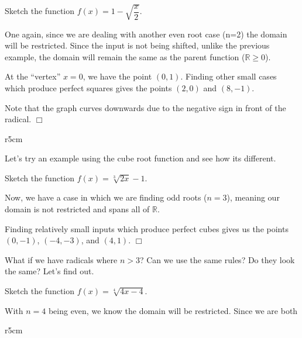\documentclass[../book.tex]{subfiles}
\begin{document}
\begin{example}
Sketch the function $f(x)=1-\sqrt{\dfrac{x}{2}}$.
\end{example}
\begin{solution}
One again, since we are dealing with another even root case (n=2) the domain will be restricted. Since the input is not being shifted, unlike the previous example, the domain will remain the same as the parent function ($\mathbb{R}\geq 0$).

At the “vertex” $x=0$, we have the point $(0,1)$. Finding other small cases which produce perfect squares gives the points $(2,0)$ and $(8,-1)$.

Note that the graph curves downwards due to the negative sign in front of the radical. $\Box$
\end{solution}

\begin{wrapfigure}{r}{5cm}
\end{wrapfigure}

Let's try an example using the cube root function and see how its different.
\begin{example}
Sketch the function $f(x)=\sqrt[3]{2x}-1$.
\end{example}
\begin{solution}
Now, we have a case in which we are finding odd roots ($n=3$), meaning our domain is not restricted and spans all of $\mathbb{R}$. 
\end{solution}
Finding relatively small inputs which produce perfect cubes gives us the points $(0,-1)$, $(-4,-3)$, and $(4,1)$. $\Box$

What if we have radicals where $n>3$? Can we use the same rules? Do they look the same? Let's find out.

\begin{example}
Sketch the function $f(x)=\sqrt[4]{4x-4}$.
\end{example}
\begin{solution}
With $n=4$ being even, we know the domain will be restricted. Since we are both 
\end{solution}

\begin{wrapfigure}{r}{5cm}
\end{wrapfigure}
\end{document}
